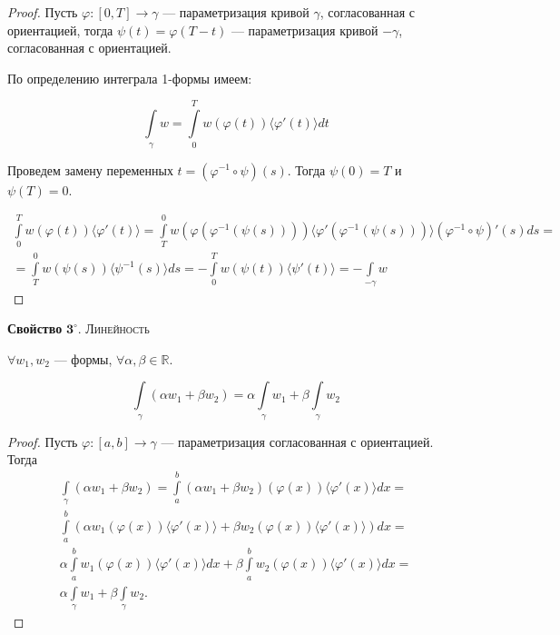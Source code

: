 \documentclass[a5paper]{article}
\theoremstyle{plain}
\theoremstyle{definition}
\numberwithin{through}{section}
\numberwithin{equation}{section}
\begin{document}
	\begin{proof}
		Пусть $\varphi : [0, T] \to \gamma$ --- параметризация кривой $\gamma$, согласованная с ориентацией, тогда $\psi(t)=\varphi(T-t)$ --- параметризация кривой $-\gamma$, согласованная с ориентацией. 
		
		По определению интеграла 1-формы имеем:
		
		\begin{equation*}
		\int\limits_{\gamma} w = \int\limits_{0}^{T} w(\varphi(t)) \langle \varphi'(t) \rangle dt
		\end{equation*}
		
		Проведем замену переменных $t = (\varphi^{-1} \circ \psi)(s)$. Тогда $\psi(0)=T$ и $\psi(T)=0$.
		
		\begin{multline*}
			\int\limits_{0}^{T} w(\varphi(t)) \langle \varphi'(t) \rangle  = \int\limits_{T}^{0} w(\varphi(\varphi^{-1}(\psi(s)))) \langle \varphi'(\varphi^{-1}(\psi(s))) \rangle (\varphi^{-1} \circ \psi)'(s) ds =\\= \int\limits_{T}^{0} w(\psi(s)) \langle \psi^{-1}(s) \rangle ds = -\int\limits_{0}^{T} w(\psi(t)) \langle \psi'(t) \rangle = -\int\limits_{-\gamma} w
		\end{multline*}
	\end{proof}

	{\bf Свойство} $\mathbf{3^\circ.}$
	{\textsc{Линейность}} \label{1FormIntLinear}
	
	$\forall w_1, w_2$ --- формы, $\forall \alpha, \beta \in \mathbb{R}$.
	
	\begin{equation*}
		\int\limits_{\gamma} (\alpha w_1 + \beta w_2) = \alpha \int\limits_{\gamma} w_1 + \beta \int\limits_{\gamma} w_2
	\end{equation*}
	
	\begin{proof}
		Пусть $\varphi: [a, b] \to \gamma$ --- параметризация согласованная с ориентацией. Тогда
		\begin{eqnarray}\nonumber
			\int\limits_{\gamma} (\alpha w_1 + \beta w_2) = \int\limits_a^b (\alpha w_1 + \beta w_2)
			(\varphi(x))\langle\varphi'(x)\rangle dx 
			= \\\nonumber
			\int\limits_a^b \left(\alpha w_1(\varphi(x))\langle\varphi'(x)\rangle + \beta w_2(\varphi(x))\langle\varphi'(x)\rangle\right) dx 
			= \\\nonumber
			\alpha\int\limits_a^b  w_1(\varphi(x))\langle\varphi'(x)\rangle dx 
			+ \beta\int\limits_a^b  w_2(\varphi(x))\langle\varphi'(x)\rangle dx
			= \\\nonumber
			\alpha \int\limits_{\gamma} w_1 + \beta \int\limits_{\gamma} w_2.
		\end{eqnarray}  
	\end{proof}
	
\end{document}
